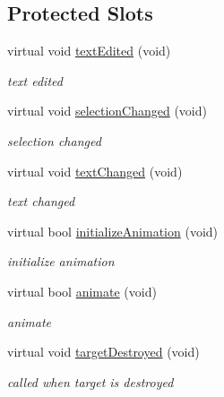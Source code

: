 \subsection*{Protected Slots}
\begin{DoxyCompactItemize}
\item 
\mbox{\label{class_line_edit_data_af2cb432f0aff0bb6228abbdbfcf8448a}} 
virtual void \hyperlink{class_line_edit_data_af2cb432f0aff0bb6228abbdbfcf8448a}{text\+Edited} (void)
\begin{DoxyCompactList}\small\item\em text edited \end{DoxyCompactList}\item 
\mbox{\label{class_line_edit_data_ab4ff16c5ef8e85cb57453f4233750e1c}} 
virtual void \hyperlink{class_line_edit_data_ab4ff16c5ef8e85cb57453f4233750e1c}{selection\+Changed} (void)
\begin{DoxyCompactList}\small\item\em selection changed \end{DoxyCompactList}\item 
\mbox{\label{class_line_edit_data_ab5871f840346c85fd3a9f135d0597aa1}} 
virtual void \hyperlink{class_line_edit_data_ab5871f840346c85fd3a9f135d0597aa1}{text\+Changed} (void)
\begin{DoxyCompactList}\small\item\em text changed \end{DoxyCompactList}\item 
\mbox{\label{class_line_edit_data_ac8d79c624e419157d974a1121e3eb030}} 
virtual bool \hyperlink{class_line_edit_data_ac8d79c624e419157d974a1121e3eb030}{initialize\+Animation} (void)
\begin{DoxyCompactList}\small\item\em initialize animation \end{DoxyCompactList}\item 
\mbox{\label{class_line_edit_data_a0e20ed7d8771b5946455947267b8752d}} 
virtual bool \hyperlink{class_line_edit_data_a0e20ed7d8771b5946455947267b8752d}{animate} (void)
\begin{DoxyCompactList}\small\item\em animate \end{DoxyCompactList}\item 
\mbox{\label{class_line_edit_data_a1d8af78522b99bdca33fea9e4ad3f05d}} 
virtual void \hyperlink{class_line_edit_data_a1d8af78522b99bdca33fea9e4ad3f05d}{target\+Destroyed} (void)
\begin{DoxyCompactList}\small\item\em called when target is destroyed \end{DoxyCompactList}\end{DoxyCompactItemize}
